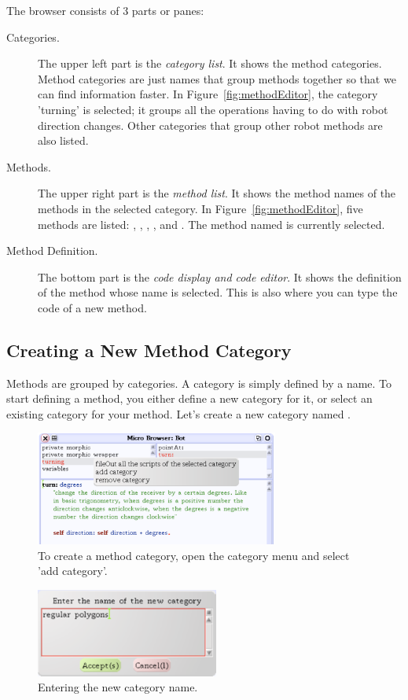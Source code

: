 The browser consists of 3 parts or panes:
\begin{description}
\item[Categories.] The upper left part is the \emph{category list}.
It shows the method categories. Method categories are just names
that group methods together so that we can find information
faster. In Figure~\ref{fig:methodEditor}, the category 'turning'
is selected; it groups all the operations having to do with robot direction changes. 
Other categories that group other robot methods are also listed.

\item[Methods.] The upper right part is the \emph{method list}.
It shows the method names of the methods  in the selected category. In Figure~\ref{fig:methodEditor}, five  methods are listed: , , \turnLeft, \turnRight, and . The method named  is currently selected.

\item[Method Definition.] The bottom part is the \emph{code display and code editor}. It shows the definition of the method whose name is selected. This is also where you can type the code of a new method.

\end{description}


\subsection{Creating a New Method Category}\label{sec:createCategory} 
Methods are grouped by categories. A category is simply defined by a name. To start defining a method, you either define a new category for it, or select an existing category for your method. Let's create a new category named .

\begin{figure}[h]
\centerline{\includegraphics[width=8cm]{tbTwo}} 
\caption{To create a method category, open the category menu and select 'add category'.\label{fig:categoryMenu}}
\end{figure}
\begin{figure}\label{fig:categoryPrompt}
\centerline{\includegraphics[width=6cm]{tbThree}}
 \caption{Entering the new category name.}
\end{figure}

